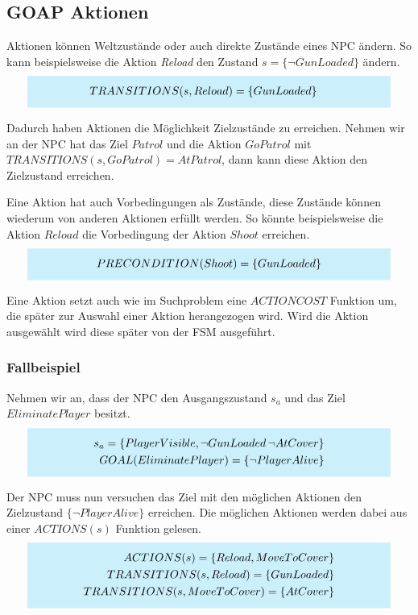 \subsection{GOAP Aktionen}

Aktionen können Weltzustände oder auch direkte Zustände eines NPC ändern. So kann beispielsweise die Aktion \textit{Reload} den Zustand $s = \{\lnot GunLoaded\}$ ändern.
\[
	\highlightbox{0.9\textwidth}{$
		\begin{align*}
			TRANSITIONS(s,Reload) &= \{GunLoaded\}
		\end{align*}
	$}
\]

Dadurch haben Aktionen die Möglichkeit Zielzustände zu erreichen. Nehmen wir an der NPC hat das Ziel $Patrol$ und die Aktion $GoPatrol$ mit $TRANSITIONS(s,GoPatrol) = {AtPatrol}$, dann kann diese Aktion den Zielzustand erreichen.

Eine Aktion hat auch Vorbedingungen als Zustände, diese Zustände können wiederum von anderen Aktionen erfüllt werden. So könnte beispielsweise die Aktion $Reload$ die Vorbedingung der Aktion $Shoot$ erreichen.
\[
	\highlightbox{0.9\textwidth}{$
		\begin{align*}
			PRECONDITION(Shoot) = \{GunLoaded\}
		\end{align*}
	$}
\]

Eine Aktion setzt auch wie im Suchproblem eine $ACTIONCOST$ Funktion um, die später zur Auswahl einer Aktion herangezogen wird. Wird die Aktion ausgewählt wird diese später von der FSM ausgeführt.


\subsubsection{Fallbeispiel}

Nehmen wir an, dass der NPC den Ausgangszustand $s_a$ und das Ziel $EliminatePlayer$ besitzt.
\[
	\highlightbox{0.9\textwidth}{$
		\begin{align*}
			s_a = \{PlayerVisible, \lnot GunLoaded\, \lnot AtCover\} \\
			GOAL(EliminatePlayer) = \{\lnot PlayerAlive\}
		\end{align*}
	$}
\]

Der NPC muss nun versuchen das Ziel mit den möglichen Aktionen den Zielzustand $\{\lnot PlayerAlive\}$ erreichen. Die möglichen Aktionen werden dabei aus einer $ACTIONS(s)$ Funktion gelesen.
\[
	\highlightbox{0.9\textwidth}{$
		\begin{align*}
			ACTIONS(s) = \{Reload, MoveToCover\} \\
			TRANSITIONS(s,Reload) = \{GunLoaded\} \\
			TRANSITIONS(s,MoveToCover) = \{AtCover\}
		\end{align*}
	$}
\]

